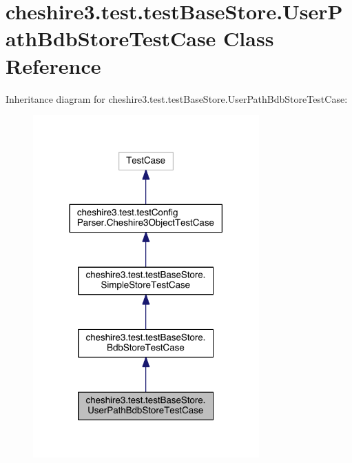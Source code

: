 \hypertarget{classcheshire3_1_1test_1_1test_base_store_1_1_user_path_bdb_store_test_case}{\section{cheshire3.\-test.\-test\-Base\-Store.\-User\-Path\-Bdb\-Store\-Test\-Case Class Reference}
\label{classcheshire3_1_1test_1_1test_base_store_1_1_user_path_bdb_store_test_case}
}


Inheritance diagram for cheshire3.\-test.\-test\-Base\-Store.\-User\-Path\-Bdb\-Store\-Test\-Case\-:
\nopagebreak
\begin{figure}[H]
\begin{center}
\leavevmode
\includegraphics[width=246pt]{classcheshire3_1_1test_1_1test_base_store_1_1_user_path_bdb_store_test_case__inherit__graph}
\end{center}
\end{figure}


